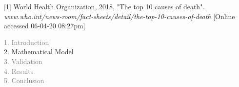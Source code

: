 \begin{frame}
\vspace{0.3cm}
\tiny [1] World Health Organization, 2018, "The top 10 causes of death".
\textit{www.who.int/news-room/fact-sheets/detail/the-top-10-causes-of-death}
[Online accessed 06-04-20 08:27pm]



\end{frame}



\begin{frame}
  \vspace{-1cm}
  \textcolor{gray}{1. Introduction}\\[0.1cm]
  2. Mathematical Model\\[0.1cm]
  \textcolor{gray}{3. Validation}\\[0.1cm]
  \textcolor{gray}{4. Results}\\[0.1cm]
  \textcolor{gray}{5. Conclusion}
\end{frame}


